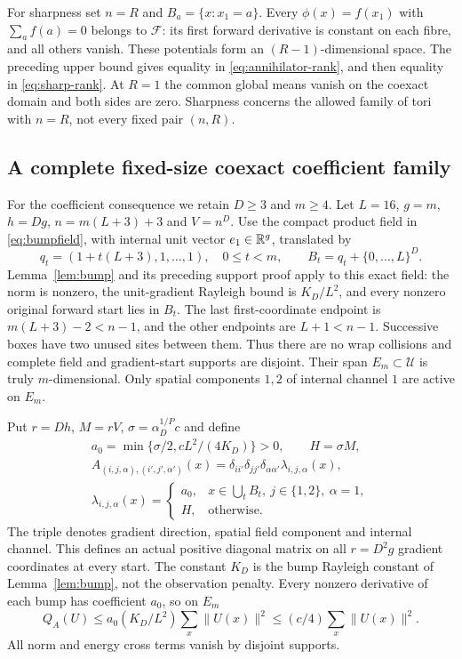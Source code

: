 For sharpness set $n=R$ and $B_a=\{x:x_1=a\}$.
Every $\phi(x)=f(x_1)$ with $\sum_af(a)=0$ belongs to $\mathcal F$:
its first forward derivative is constant on each fibre, and all others
vanish. These potentials form an $(R-1)$-dimensional space. The preceding
upper bound gives equality in \eqref{eq:annihilator-rank}, and then equality
in \eqref{eq:sharp-rank}. At $R=1$ the common global means vanish on the
coexact domain and both sides are zero. Sharpness concerns the allowed
family of tori with $n=R$, not every fixed pair $(n,R)$.

\subsection{A complete fixed-size coexact coefficient family}
For the coefficient consequence we retain $D\ge3$ and $m\ge4$.
Let $L=16$, $g=m$, $h=Dg$, $n=m(L+3)+3$ and $V=n^D$.
Use the compact product field in \eqref{eq:bumpfield}, with internal
unit vector $e_1\in\mathbb R^g$, translated by
\[
 q_t=(1+t(L+3),1,\ldots,1),\quad0\le t<m,
 \qquad B_t=q_t+\{0,\ldots,L\}^D.
\]
Lemma~\ref{lem:bump} and its preceding support proof apply to this exact
field: the norm is nonzero, the unit-gradient Rayleigh bound is $K_D/L^2$,
and every nonzero original forward start lies in $B_t$. The last
first-coordinate endpoint is $m(L+3)-2<n-1$, and the other endpoints are
$L+1<n-1$. Successive boxes have two unused sites between them.
Thus there are no wrap collisions and complete field and gradient-start
supports are disjoint. Their span $E_m\subset\mathcal U$ is truly
$m$-dimensional. Only spatial components $1,2$ of internal channel $1$
are active on $E_m$.

Put $r=Dh$, $M=rV$, $\sigma=\alpha_D^{1/P}c$ and define
\begin{equation}\label{eq:coexact-family}
 \begin{gathered}
 a_0=\min\{\sigma/2,cL^2/(4K_D)\}>0,\qquad H=\sigma M,\\
 A_{(i,j,\alpha),(i',j',\alpha')}(x)=
 \delta_{ii'}\delta_{jj'}\delta_{\alpha\alpha'}\lambda_{i,j,\alpha}(x),\\
 \lambda_{i,j,\alpha}(x)=
 \begin{cases}
 a_0,&x\in\bigcup_tB_t,\ j\in\{1,2\},\ \alpha=1,\\
 H,&\text{otherwise}.
 \end{cases}
 \end{gathered}
\end{equation}
The triple denotes gradient direction, spatial field component and
internal channel. This defines an actual positive diagonal matrix on all
$r=D^2g$ gradient coordinates at every start. The constant $K_D$ is the
bump Rayleigh constant of Lemma~\ref{lem:bump}, not the observation penalty.
Every nonzero derivative of each bump has coefficient $a_0$, so on $E_m$
\begin{equation}\label{eq:fixed-coexact-low}
 Q_A(U)\le a_0(K_D/L^2)\sum_x\|U(x)\|^2
                  \le(c/4)\sum_x\|U(x)\|^2.
\end{equation}
All norm and energy cross terms vanish by disjoint supports.

